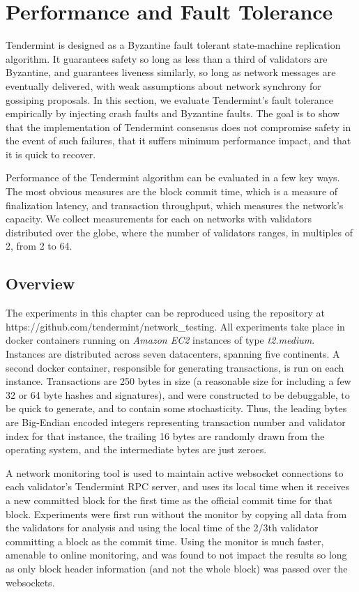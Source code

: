 \chapter{Performance and Fault Tolerance}
\label{ch:performance}

Tendermint is designed as a Byzantine fault tolerant state-machine replication algorithm.
It guarantees safety so long as less than a third of validators are Byzantine, 
and guarantees liveness similarly, so long as network messages are eventually delivered,
with weak assumptions about network synchrony for gossiping proposals.
In this section, we evaluate Tendermint's fault tolerance empirically by injecting 
crash faults and Byzantine faults.
The goal is to show that the implementation of Tendermint consensus does not compromise safety in the event of such failures,
that it suffers minimum performance impact, and that it is quick to recover.

Performance of the Tendermint algorithm can be evaluated in a few key ways.
The most obvious measures are the block commit time, which is a measure of finalization latency, 
and transaction throughput, which measures the network's capacity.
We collect measurements for each on networks with validators distributed over the globe, 
where the number of validators ranges, in multiples of 2, from 2 to 64.

\section{Overview}

The experiments in this chapter can be reproduced using the repository at https://github.com/tendermint/network\_testing.
All experiments take place in docker containers running on \emph{Amazon EC2} instances of type \emph{t2.medium}.
Instances are distributed across seven datacenters, spanning five continents.
A second docker container, responsible for generating transactions, is run on each instance.
Transactions are 250 bytes in size (a reasonable size for including a few 32 or 64 byte hashes and signatures),
and were constructed to be debuggable, to be quick to generate, and to contain some stochasticity.
Thus, the leading bytes are Big-Endian encoded integers 
representing transaction number and validator index for that instance,
the trailing 16 bytes are randomly drawn from the operating system, 
and the intermediate bytes are just zeroes.

A network monitoring tool is used to maintain active websocket connections to each validator's Tendermint RPC server,
and uses its local time when it receives a new committed block for the first time as the official commit time for that block.
Experiments were first run without the monitor by copying all data from the validators for analysis and using the local time
of the 2/3th validator committing a block as the commit time. 
Using the monitor is much faster, amenable to online monitoring, and was found to not impact the results 
so long as only block header information (and not the whole block) was passed over the websockets.

